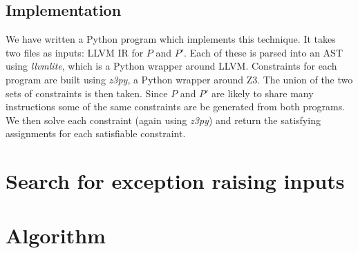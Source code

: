 \subsection{Implementation}

We have written a Python program which implements this technique. It takes two
files as inputs: LLVM IR for $P$ and $P'$. Each of these is parsed into an AST
using \textit{llvmlite}, which is a Python wrapper around LLVM. Constraints for
each program are built using \textit{z3py}, a Python wrapper around Z3. The
union of the two sets of constraints is then taken. Since $P$ and $P'$ are
likely to share many instructions some of the same constraints are be generated
from both programs. We then solve each constraint (again using \textit{z3py})
and return the satisfying assignments for each satisfiable constraint.

\section{Search for exception raising inputs}

\section{Algorithm}

